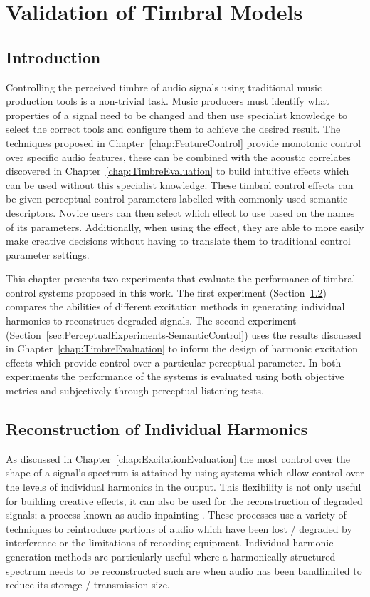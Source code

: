 \chapter{Validation of Timbral Models}
\label{chap:PerceptualExperiments}

\section{Introduction}
\label{sec:PerceptualExperiments-Introduction}
	Controlling the perceived timbre of audio signals using traditional music production tools is a non-trivial task.
	Music producers must identify what properties of a signal need to be changed and then use specialist knowledge to
	select the correct tools and configure them to achieve the desired result. The techniques proposed in
	Chapter~\ref{chap:FeatureControl} provide monotonic control over specific audio features, these can be combined
	with the acoustic correlates discovered in Chapter~\ref{chap:TimbreEvaluation} to build intuitive effects which can
	be used without this specialist knowledge. These timbral control effects can be given perceptual control parameters
	labelled with commonly used semantic descriptors. Novice users can then select which effect to use based on the
	names of its parameters. Additionally, when using the effect, they are able to more easily make creative decisions
	without having to translate them to traditional control parameter settings.

	This chapter presents two experiments that evaluate the performance of timbral control systems proposed in this
	work. The first experiment (Section~\ref{sec:PerceptualExperiments-Reconstruction}) compares the abilities of
	different excitation methods in generating individual harmonics to reconstruct degraded signals. The second
	experiment (Section~\ref{sec:PerceptualExperiments-SemanticControl}) uses the results discussed in
	Chapter~\ref{chap:TimbreEvaluation} to inform the design of harmonic excitation effects which provide control over
	a particular perceptual parameter. In both experiments the performance of the systems is evaluated using both
	objective metrics and subjectively through perceptual listening tests.

\section{Reconstruction of Individual Harmonics}
\label{sec:PerceptualExperiments-Reconstruction}
	As discussed in Chapter~\ref{chap:ExcitationEvaluation} the most control over the shape of a signal's spectrum is
	attained by using systems which allow control over the levels of individual harmonics in the output. This
	flexibility is not only useful for building creative effects, it can also be used for the reconstruction of
	degraded signals; a process known as audio inpainting \citep{adler2012audio}. These processes use a variety of
	techniques to reintroduce portions of audio which have been lost / degraded by interference or the limitations of
	recording equipment. Individual harmonic generation methods are particularly useful where a harmonically structured
	spectrum needs to be reconstructed such are when audio has been bandlimited to reduce its storage / transmission
	size.

